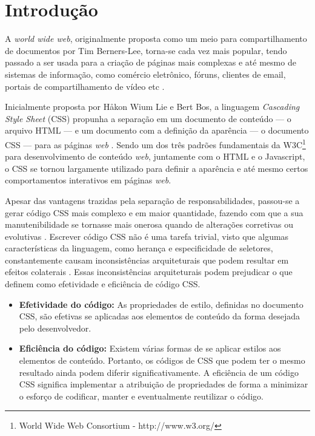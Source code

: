 \chapter{Introdução}
\label{chap:Intr}
A \textit{world wide web}, originalmente proposta como um meio para compartilhamento de documentos por Tim Berners-Lee, torna-se cada vez mais popular, tendo passado a ser usada para a criação de páginas mais complexas e até mesmo de sistemas de informação, como comércio eletrônico, fóruns, clientes de email, portais de compartilhamento de vídeo etc \cite{Berners-Lee:2000:WWO:556560}.

Inicialmente proposta por Håkon Wium Lie e Bert Bos, a linguagem \textit{Cascading Style Sheet} (CSS) propunha a separação em um documento de conteúdo --- o arquivo HTML --- e um documento com a definição da aparência --- o documento CSS --- para as páginas \textit{web} \cite{Hakon:2005}. Sendo um dos três padrões fundamentais da W3C\footnote{World Wide Web Consortium - http://www.w3.org/} para desenvolvimento de conteúdo \textit{web}, juntamente com o HTML e o Javascript, o CSS se tornou largamente utilizado para definir a aparência e até mesmo certos comportamentos interativos em páginas \textit{web}. 

Apesar das vantagens trazidas pela separação de responsabilidades, passou-se a gerar código CSS mais complexo e em maior quantidade, fazendo com que a sua manutenibilidade se tornasse mais onerosa quando de alterações corretivas ou evolutivas \cite{Mesbah2012}.
Escrever código CSS não é uma tarefa trivial, visto que algumas características da linguagem, como herança e especificidade de seletores, constantemente causam inconsistências arquiteturais que podem resultar em efeitos colaterais \cite{Walton:2015}.
Essas inconsistências arquiteturais podem prejudicar o que  definem como efetividade e eficiência de código CSS.

\begin{itemize}
	\item\textbf{Efetividade do código:} As propriedades de estilo, definidas no documento CSS, são efetivas se aplicadas aos elementos de conteúdo da forma desejada pelo desenvolvedor.
	
	\item\textbf{Eficiência do código:} Existem várias formas de se aplicar estilos aos elementos de conteúdo. Portanto, os códigos de CSS que podem ter o mesmo resultado ainda podem diferir significativamente. A eficiência de um código CSS significa implementar a atribuição de propriedades de forma a minimizar o esforço de codificar, manter e eventualmente reutilizar o código.
\end{itemize}

